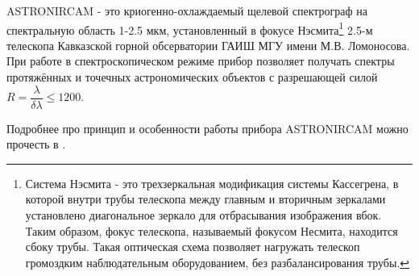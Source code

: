 \documentclass[a4paper]{article}
\begin{document}
ASTRONIRCAM - это криогенно-охлаждаемый щелевой спектрограф на спектральную область 1-2.5 мкм, установленный в фокусе Нэсмита\footnote{Система Нэсмита - это трехзеркальная модификация системы Кассегрена, в которой внутри трубы телескопа между главным и вторичным зеркалами установлено диагональное зеркало для отбрасывания изображения вбок. Таким образом, фокус телескопа, называемый фокусом Несмита, находится сбоку трубы. Такая оптическая схема позволяет нагружать телескоп громоздким наблюдательным оборудованием, без разбалансирования трубы.} 2.5-м телескопа Кавказской горной обсерватории ГАИШ МГУ имени М.В. Ломоносова. При работе в спектроскопическом режиме прибор позволяет получать спектры протяжённых и точечных астрономических объектов с разрешающей силой $R = \dfrac{\lambda}{\delta\lambda}\leq 1200$.

Подробнее про принцип и особенности работы прибора ASTRONIRCAM можно прочесть в \cite{Sulsky1994}.

\hfill\break
\end{document}
